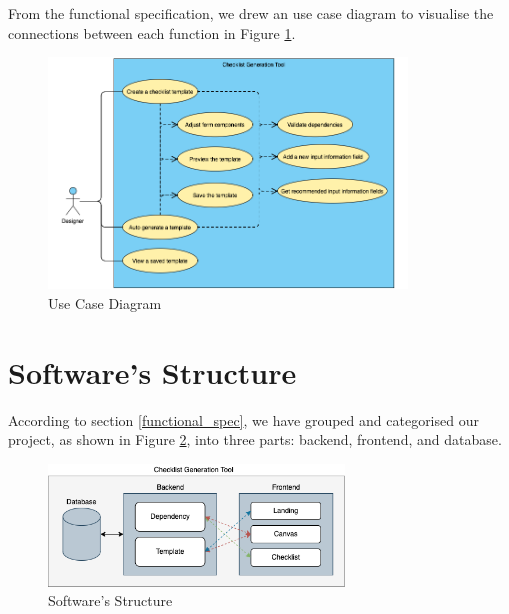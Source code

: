 From the functional specification, we drew an use case diagram to visualise the connections between each function in Figure \ref{fig:use_case_diagram}.

\begin{figure}[ht!]
    \centering
    \includegraphics[width=0.85\textwidth]{overleaf/images/use_case_diagram.png}
    \caption{Use Case Diagram}
    \label{fig:use_case_diagram}
\end{figure}



\section{Software's Structure}
\label{design:software_structure}
According to section \ref{functional_spec}, we have grouped and categorised our project, as shown in Figure \ref{fig:software_structure}, into three parts: backend, frontend, and database.

\begin{figure}
    \centering
    \includegraphics[width=0.7\textwidth]{overleaf/images/software_structure.png}
    \caption{Software's Structure}
    \label{fig:software_structure}
\end{figure}

